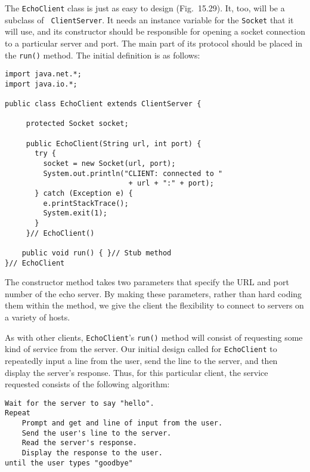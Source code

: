 \noindent The {\tt EchoClient} class is just as easy to design
(Fig.~15.29).  It, too, will be a subclass of {\tt
ClientServer}. It needs an instance variable for the {\tt Socket} that
it will use, and its constructor should be responsible for opening a
socket connection to a particular server and port.  The main part of
its protocol should be placed in the {\tt run()} method.  The initial
definition is as follows:


\begin{jjjlisting}
\begin{lstlisting}
import java.net.*;
import java.io.*;

public class EchoClient extends ClientServer {

     protected Socket socket;

     public EchoClient(String url, int port) {
       try {
         socket = new Socket(url, port);
         System.out.println("CLIENT: connected to " 
                             + url + ":" + port);
       } catch (Exception e) {
         e.printStackTrace();
         System.exit(1);
       }
     }// EchoClient()

    public void run() { }// Stub method
}// EchoClient
\end{lstlisting}
\end{jjjlisting}

\noindent The constructor method takes two
parameters that specify the URL and port number of the echo server.  By
making these parameters, rather than hard coding them within the
method, we give the client the flexibility to connect to servers on a
variety of hosts.

As with other clients, {\tt EchoClient}'s {\tt run()} method will
consist of requesting some kind of service from the server.  Our
initial design called for {\tt EchoClient} to repeatedly input a line
from the user, send the line to the server, and then display the
server's response.   Thus, for this particular client, the
service requested consists of the following algorithm:

\begin{jjjlisting}
\begin{lstlisting}
Wait for the server to say "hello".
Repeat
    Prompt and get and line of input from the user.
    Send the user's line to the server.
    Read the server's response.
    Display the response to the user.
until the user types "goodbye"
\end{lstlisting}
\end{jjjlisting}

